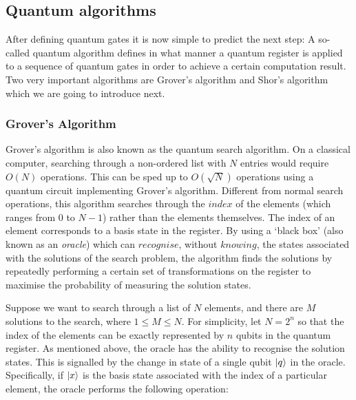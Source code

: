 \documentclass[bibliography=totocnumbered, 10pt]{article}
\theoremstyle{NoticeStyle}
\begin{document}


\subsection{Quantum algorithms}\label{sec:Quantum algorithms}

After defining quantum gates it is now simple to predict the next step: A so-called quantum algorithm defines in what manner a quantum register is applied to a sequence of quantum gates in order to achieve a certain computation result. Two very important algorithms are Grover's algorithm and Shor's algorithm which we are going to introduce next.



\subsubsection{Grover's Algorithm}
Grover's algorithm is also known as the quantum search algorithm. On a classical computer, searching through a non-ordered list with $N$ entries would require $O(N)$ operations. This can be sped up to $O(\sqrt{N})$ operations using a quantum circuit implementing Grover's algorithm. Different from normal search operations, this algorithm searches through the $index$ of the elements (which ranges from $0$ to $N-1$) rather than the elements themselves. The index of an element corresponds to a basis state in the register. By using a `black box' (also known as an \emph{oracle}) which can $recognise$, without $knowing$, the states associated with the solutions of the search problem, the algorithm finds the solutions by repeatedly performing a certain set of transformations on the register to maximise the probability of measuring the solution states.

Suppose we want to search through a list of $N$ elements, and there are $M$ solutions to the search, where $ 1 \leq M \leq N$. For simplicity, let $N = 2^n$ so that the index of the elements can be exactly represented by $n$ qubits in the quantum register. As mentioned above, the oracle has the ability to recognise the solution states. This is signalled by the change in state of a single qubit ${\left\vert{q}\right\rangle}$ in the oracle. Specifically, if ${\left\vert{x}\right\rangle}$ is the basis state associated with the index of a particular element, the oracle performs the following operation:
\end{document}
